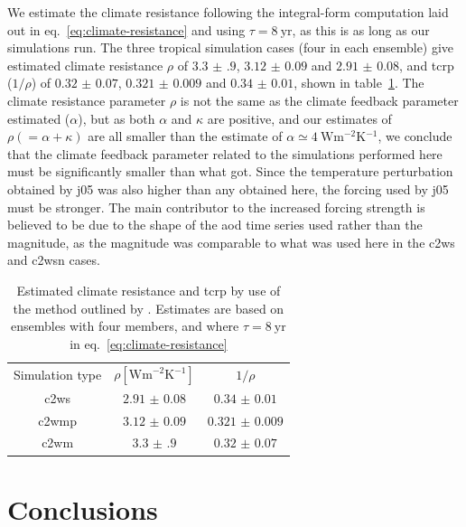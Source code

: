 \documentclass{ametsocV6.1}
\begin{document}
We estimate the climate resistance following the integral-form computation laid out in
eq.~\ref{eq:climate-resistance} and using \(\tau =\SI{8}{\mathrm{yr}}\), as this is as
long as our simulations run. The three tropical simulation cases (four in each ensemble)
give estimated climate resistance \(\rho \) of \(\num{3.3(9)}\), \(\num{3.12(9)}\) and
\(\num{2.91(8)}\), and \gls{tcrp} (\(1/\rho\)) of \(\num{0.32(7)}\), \(\num{0.321(9)}\)
and \(\num{0.34(1)}\), shown in table~\ref{tab:trcp}. The climate resistance parameter
\(\rho\) is not the same as the climate feedback parameter \citet{jones2005} estimated
(\(\alpha\)), but as both \(\alpha \) and \(\kappa \) are positive, and our estimates of
\(\rho (=\alpha +\kappa) \) are all smaller than the \citet{jones2005} estimate of
\(\alpha \simeq \SI{4}{\watt\metre^{-2}\kelvin^{-1}}\), we conclude that the climate
feedback parameter related to the simulations performed here must be significantly
smaller than what \citet{jones2005} got. Since the temperature perturbation obtained by
\gls{j05} was also higher than any obtained here, the forcing used by \gls{j05} must be
stronger. The main contributor to the increased forcing strength is believed to be due
to the shape of the \gls{aod} time series used rather than the magnitude, as the
magnitude was comparable to what was used here in the \gls{c2ws} and \gls{c2wsn} cases.

\begin{table}
  \centering

  \caption{Estimated climate resistance and \gls{tcrp} by use of the method outlined by
    \citet{merlis2014}. Estimates are based on ensembles with four members, and where \(\tau
    =\SI{8}{\mathrm{yr}}\) in eq.~\ref{eq:climate-resistance}}\label{tab:trcp}%
  \begin{tabular}{ccc}
    Simulation type & \(\rho [\si{\watt\metre^{-2}\kelvin^{-1}}]\) & \(1/\rho\)         \\
    \gls{c2ws}      & \(\num{2.91(8)}\)                            & \(\num{0.34(1)}\)  \\
    \gls{c2wmp}     & \(\num{3.12(9)}\)                            & \(\num{0.321(9)}\) \\
    \gls{c2wm}      & \(\num{3.3(9)}\)                             & \(\num{0.32(7)}\)  \\
  \end{tabular}
\end{table}

\section{Conclusions}\label{sec:conclusions}
\end{document}
